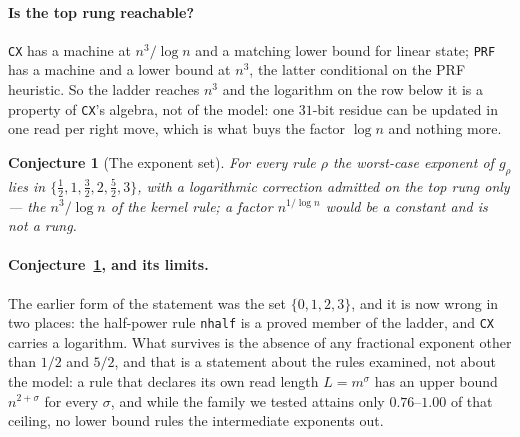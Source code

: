 \documentclass[11pt]{article}
\newtheorem{conjecture}{Conjecture}
\theoremstyle{remark}
\begin{document}
\paragraph{Is the top rung reachable?} \texttt{CX} has a machine at $n^{3}/\log n$ and a matching
lower bound for linear state; \texttt{PRF} has a machine and a lower bound at $n^{3}$, the latter
conditional on the PRF heuristic. So the ladder reaches $n^{3}$ and the logarithm on the row below it
is a property of \texttt{CX}'s algebra, not of the model: one $31$-bit residue can be updated in one
read per right move, which is what buys the factor $\log n$ and nothing more.


\begin{conjecture}[The exponent set]\label{conj:exponents}
For every rule $\rho$ the worst-case exponent of $g_{\rho}$ lies in
$\{\tfrac12,1,\tfrac32,2,\tfrac52,3\}$, with a logarithmic correction admitted on the top rung only
--- the $n^{3}/\log n$ of the kernel rule; a factor $n^{1/\log n}$ would be a constant and is not a rung.
\end{conjecture}

\paragraph{Conjecture~\ref{conj:exponents}, and its limits.} The earlier form of the statement was the
set $\{0,1,2,3\}$, and it is now wrong in two places: the half-power rule \texttt{nhalf} is a proved
member of the ladder, and \texttt{CX} carries a logarithm. What survives is the absence of any
fractional exponent other than $1/2$ and $5/2$, and that is a statement about the rules examined, not
about the model: a rule that declares its own read length $L=m^{\sigma}$ has an upper bound
$n^{2+\sigma}$ for every $\sigma$, and while the family we tested attains only $0.76$--$1.00$ of that
ceiling, no lower bound rules the intermediate exponents out.
\end{document}
